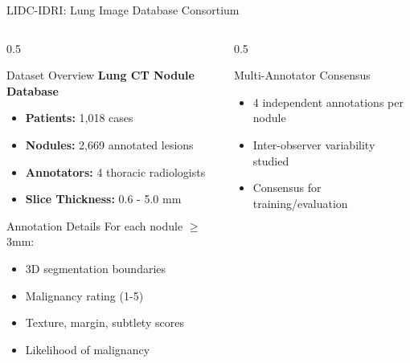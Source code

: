 \documentclass[aspectratio=169]{beamer}
\begin{document}
\begin{frame}{LIDC-IDRI: Lung Image Database Consortium}
    \begin{columns}
        \begin{column}{0.5\textwidth}
            \begin{block}{Dataset Overview}
                \textbf{Lung CT Nodule Database}
                \begin{itemize}
                    \item \textbf{Patients:} 1,018 cases
                    \item \textbf{Nodules:} 2,669 annotated lesions
                    \item \textbf{Annotators:} 4 thoracic radiologists
                    \item \textbf{Slice Thickness:} 0.6 - 5.0 mm
                \end{itemize}
            \end{block}
            
            \begin{block}{Annotation Details}
                For each nodule $\geq$ 3mm:
                \begin{itemize}
                    \item 3D segmentation boundaries
                    \item Malignancy rating (1-5)
                    \item Texture, margin, subtlety scores
                    \item Likelihood of malignancy
                \end{itemize}
            \end{block}
        \end{column}
        \begin{column}{0.5\textwidth}
            \begin{block}{Multi-Annotator Consensus}
                \begin{itemize}
                    \item 4 independent annotations per nodule
                    \item Inter-observer variability studied
                    \item Consensus for training/evaluation
                \end{itemize}
            \end{block}
            

\end{column}
\end{columns}
\end{frame}
\end{document}
